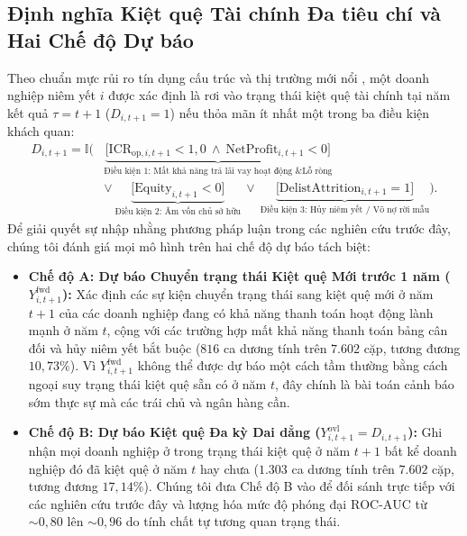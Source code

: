 \documentclass[11pt,a4paper]{article}
\begin{document}
\subsection{Định nghĩa Kiệt quệ Tài chính Đa tiêu chí và Hai Chế độ Dự báo}
Theo chuẩn mực rủi ro tín dụng cấu trúc và thị trường mới nổi \citep{asquith1994anatomy,pindado2008estimating,tinoco2013financial,tran2023examining}, một doanh nghiệp niêm yết $i$ được xác định là rơi vào trạng thái kiệt quệ tài chính tại năm kết quả $\tau = t+1$ ($D_{i,t+1} = 1$) nếu thỏa mãn ít nhất một trong ba điều kiện khách quan:
\begin{equation}
\begin{aligned}
    D_{i,t+1} = \mathbb{I}\Big( &\underbrace{\big[\text{ICR}_{\text{op},i,t+1} < 1,0 \ \wedge \ \text{NetProfit}_{i,t+1} < 0\big]}_{\text{Điều kiện 1: Mất khả năng trả lãi vay hoạt động \& Lỗ ròng}} \\
    &\vee \ \underbrace{\big[\text{Equity}_{i,t+1} < 0\big]}_{\text{Điều kiện 2: Âm vốn chủ sở hữu}} \ \vee \ \underbrace{\big[\text{DelistAttrition}_{i,t+1} = 1\big]}_{\text{Điều kiện 3: Hủy niêm yết / Vỡ nợ rời mẫu}} \Big).
\end{aligned}
\end{equation}
Để giải quyết sự nhập nhằng phương pháp luận trong các nghiên cứu trước đây, chúng tôi đánh giá mọi mô hình trên hai chế độ dự báo tách biệt:
\begin{itemize}
    \item \textbf{Chế độ A: Dự báo Chuyển trạng thái Kiệt quệ Mới trước 1 năm ($Y_{i,t+1}^{\text{fwd}}$):} Xác định các sự kiện chuyển trạng thái sang kiệt quệ mới ở năm $t+1$ của các doanh nghiệp đang có khả năng thanh toán hoạt động lành mạnh ở năm $t$, cộng với các trường hợp mất khả năng thanh toán bảng cân đối và hủy niêm yết bắt buộc ($816$ ca dương tính trên $7.602$ cặp, tương đương $10,73\%$). Vì $Y_{i,t+1}^{\text{fwd}}$ không thể được dự báo một cách tầm thường bằng cách ngoại suy trạng thái kiệt quệ sẵn có ở năm $t$, đây chính là bài toán cảnh báo sớm thực sự mà các trái chủ và ngân hàng cần.
    \item \textbf{Chế độ B: Dự báo Kiệt quệ Đa kỳ Dai dẳng ($Y_{i,t+1}^{\text{ovl}} = D_{i,t+1}$):} Ghi nhận mọi doanh nghiệp ở trong trạng thái kiệt quệ ở năm $t+1$ bất kể doanh nghiệp đó đã kiệt quệ ở năm $t$ hay chưa ($1.303$ ca dương tính trên $7.602$ cặp, tương đương $17,14\%$). Chúng tôi đưa Chế độ B vào để đối sánh trực tiếp với các nghiên cứu trước đây \citep[ví dụ:][]{tran2022explainable,tran2023examining} và lượng hóa mức độ phóng đại $\text{ROC-AUC}$ từ $\sim 0,80$ lên $\sim 0,96$ do tính chất tự tương quan trạng thái.
\end{itemize}
\end{document}
